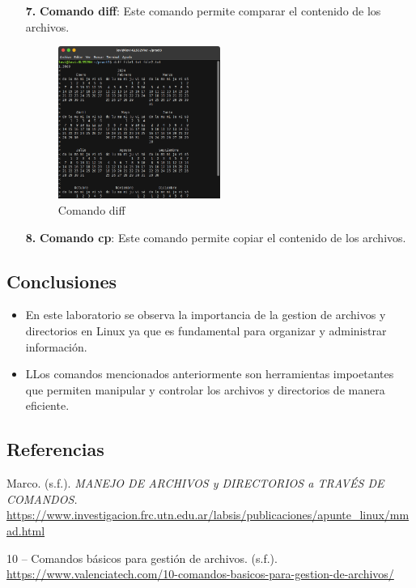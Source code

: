 \documentclass[11pt,twoside]{book}
\begin{document}
\begin{enumerate}
    \item [\textbf{7.}] \textbf{Comando diff}: Este comando permite comparar el contenido de los archivos.  
    \begin{figure}[htb]
    \centering
    \includegraphics[width=0.5\textwidth]{introduccion/Lab3/diff.png}
    \caption{Comando diff}
   \label{fig:etiqueta}
    \end{figure}
    \newpage
      \item [\textbf{8.}] \textbf{Comando cp}: Este comando permite copiar el contenido de los archivos.  

\end{enumerate}

\subsection*{Conclusiones}
\begin{itemize}
  \item En este laboratorio se observa la importancia de la gestion de archivos y directorios en Linux ya que es fundamental para organizar y administrar información.
  \item LLos comandos mencionados anteriormente son herramientas impoetantes que permiten manipular y controlar los archivos y directorios de manera eficiente.
\end{itemize}

\subsection*{Referencias}

Marco. (s.f.). \textit{MANEJO DE ARCHIVOS y DIRECTORIOS a TRAVÉS DE COMANDOS.} \url{https://www.investigacion.frc.utn.edu.ar/labsis/publicaciones/apunte_linux/mmad.html}

10 – Comandos básicos para gestión de archivos. (s.f.). \url{https://www.valenciatech.com/10-comandos-basicos-para-gestion-de-archivos/}
\break
\newpage
\end{document}
